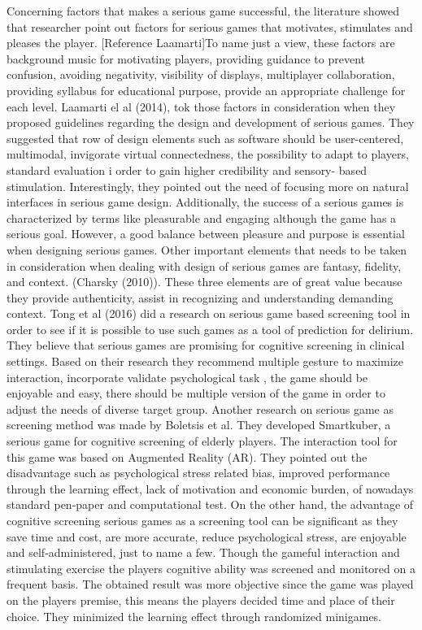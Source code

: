 Concerning factors that makes a serious game successful, the literature showed that researcher point out factors for serious games that motivates, stimulates and pleases the player. [Reference Laamarti]To name just a view, these factors are background music for motivating players, providing guidance to prevent confusion, avoiding negativity, visibility of displays, multiplayer collaboration, providing syllabus for educational purpose, provide an appropriate challenge for each level.
Laamarti el al (2014), tok those factors in consideration when they proposed guidelines regarding the design and development of serious games. They suggested that row of design elements such as software should be user-centered, multimodal, invigorate virtual connectedness, the possibility to adapt to players, standard evaluation i order to gain higher credibility and sensory- based stimulation.
Interestingly, they pointed out the need of focusing more on natural interfaces in serious game design. Additionally, the success of a  serious games is characterized by terms like  pleasurable and engaging although the game has a serious goal. However, a good balance between pleasure and purpose is essential when designing serious games.
Other important elements that needs to be taken in consideration when dealing with design of serious games are fantasy, fidelity, and context. (Charsky (2010)).  These three elements are of great value because they provide authenticity, assist in recognizing and understanding demanding context.
Tong et al (2016) did a research on serious game based screening tool in order to see if it is possible to use such games as a tool of prediction for delirium. They believe that serious games are promising for cognitive screening in clinical settings.  Based on their research they recommend multiple gesture to maximize interaction, incorporate validate psychological task , the game should be enjoyable and easy, there should be multiple version of the game in order to adjust the needs of diverse target group. 
Another research on serious game as screening method  was made by Boletsis et al. They developed Smartkuber, a serious game for cognitive screening of elderly players. The interaction tool for this game was based on Augmented Reality (AR). They pointed out the disadvantage such as psychological stress related bias, improved performance through the learning effect, lack of motivation and economic burden, of nowadays standard pen-paper and computational test. On the other hand, the advantage of cognitive screening serious games as a screening tool can be significant as they save time and cost, are more accurate, reduce psychological stress, are enjoyable and self-administered, just to name a few.  Though the gameful interaction and stimulating exercise the players cognitive ability was screened and monitored on a frequent basis. The obtained result was more objective since the game was played on the players premise, this means the players decided time and place of their choice. They minimized the learning effect through randomized minigames. 
 


